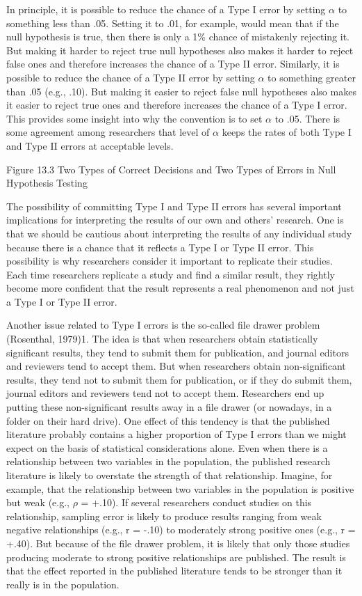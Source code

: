 In principle, it is possible to reduce the chance of a Type I error by setting $\alpha$ to something less than .05. Setting it to .01, for example, would mean that if the null hypothesis is true, then there is only a 1\% chance of mistakenly rejecting it. But making it harder to reject true null hypotheses also makes it harder to reject false ones and therefore increases the chance of a Type II error. Similarly, it is possible to reduce the chance of a Type II error by setting $\alpha$ to something greater than .05 (e.g., .10). But making it easier to reject false null hypotheses also makes it easier to reject true ones and therefore increases the chance of a Type I error. This provides some insight into why the
convention is to set $\alpha$ to .05.  There is some agreement among researchers that level of $\alpha$ keeps the rates of both Type I and Type II errors at acceptable levels.

Figure 13.3 Two Types of Correct Decisions and Two Types of Errors in Null Hypothesis Testing


 The possibility of committing Type I and Type II errors has several important implications for interpreting the results of our own and others' research. One is that we should be cautious about interpreting the results of any individual study because there is a chance that it reflects a Type I or Type II error. This possibility is why researchers consider it important to replicate their studies. Each time researchers replicate a study and find a similar result, they rightly become more confident that the result represents a real phenomenon and not just a Type I or Type II error.

 
 Another issue related to Type I errors is the so-called file drawer problem (Rosenthal, 1979)1. The idea is that when researchers obtain statistically significant results, they tend to submit them for publication, and journal editors and reviewers tend to accept them. But when researchers obtain non-significant results, they tend not to submit them for publication, or if they do submit them, journal editors and reviewers tend not to accept them. Researchers end up putting these non-significant results away in a file drawer (or nowadays, in a folder on their hard drive). One effect of this tendency is that the published literature probably contains a higher proportion of Type I errors than we might expect on the basis of statistical considerations alone. Even when there is a relationship between two variables in the population, the published research literature is likely to overstate the strength of that relationship. Imagine, for example, that the relationship between two variables in the population is positive but weak (e.g., $\rho$ = +.10). If several researchers conduct studies on this relationship, sampling error is likely to produce results ranging from weak negative relationships (e.g., r = -.10) to moderately strong positive ones (e.g., r = +.40). But because of the file drawer problem, it is likely that only those studies producing moderate to strong positive relationships are published. The result is that the effect reported in the published literature tends to be stronger than it really is in the population.

